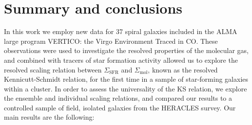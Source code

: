 \documentclass[longauth]{aa}
\begin{document}
\bigskip

\section{Summary and conclusions}
\label{sec:summary}
In this work we employ new data for 37 spiral galaxies included in the ALMA large program VERTICO: the Virgo Environment Traced in CO. These observations were used to investigate the resolved properties of the molecular gas, and combined with tracers of star formation activity allowed us to explore the resolved scaling relation between $\Sigma_\mathrm{SFR}$ and $\Sigma_\mathrm{mol}$, known as the resolved Kennicutt-Schmidt relation, for the first time in a sample of star-forming galaxies within a cluster. In order to assess the universality of the KS relation, we explore the ensemble and individual scaling relations, and compared our results to a controlled sample of field, isolated galaxies from the HERACLES survey. Our main results are the following:
\end{document}
